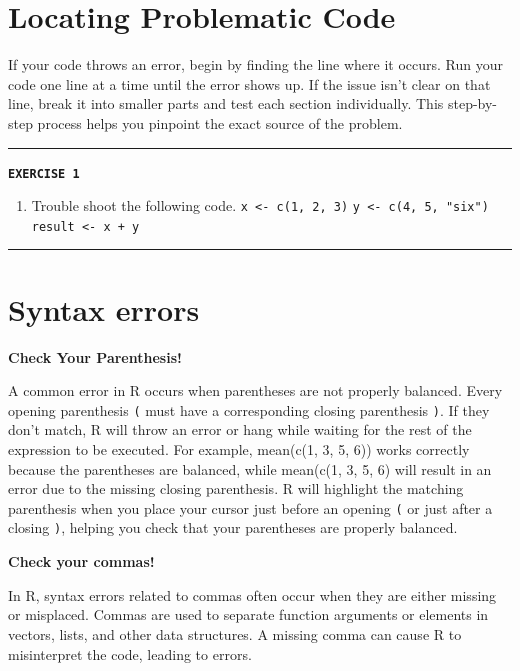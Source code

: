 \documentclass[
]{book}
\providecommand{\tightlist}{%
  \setlength{\itemsep}{0pt}\setlength{\parskip}{0pt}}
\begin{document}
\section{Locating Problematic Code}\label{locating-problematic-code}

If your code throws an error, begin by finding the line where it occurs. Run your code one line at a time until the error shows up. If the issue isn't clear on that line, break it into smaller parts and test each section individually. This step-by-step process helps you pinpoint the exact source of the problem.

\begin{center}\rule{0.5\linewidth}{0.5pt}\end{center}

\textbf{\texttt{EXERCISE\ 1}}

\begin{enumerate}
\def\labelenumi{\arabic{enumi}.}
\tightlist
\item
  Trouble shoot the following code.
  \texttt{x\ \textless{}-\ c(1,\ 2,\ 3)}
  \texttt{y\ \textless{}-\ c(4,\ 5,\ "six")}
  \texttt{result\ \textless{}-\ x\ +\ y}
\end{enumerate}

\begin{center}\rule{0.5\linewidth}{0.5pt}\end{center}

\section{Syntax errors}\label{syntax-errors}

\textbf{Check Your Parenthesis!}

A common error in R occurs when parentheses are not properly balanced. Every opening parenthesis \texttt{(} must have a corresponding closing parenthesis \texttt{)}. If they don't match, R will throw an error or hang while waiting for the rest of the expression to be executed. For example, mean(c(1, 3, 5, 6)) works correctly because the parentheses are balanced, while mean(c(1, 3, 5, 6) will result in an error due to the missing closing parenthesis. R will highlight the matching parenthesis when you place your cursor just before an opening \texttt{(} or just after a closing \texttt{)}, helping you check that your parentheses are properly balanced.

\textbf{Check your commas!}

In R, syntax errors related to commas often occur when they are either missing or misplaced. Commas are used to separate function arguments or elements in vectors, lists, and other data structures. A missing comma can cause R to misinterpret the code, leading to errors.
\end{document}
